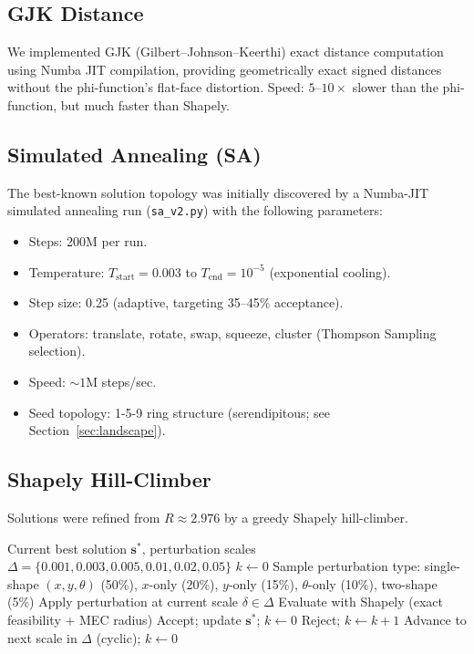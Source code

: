\documentclass[11pt]{article}
\begin{document}
\subsection{GJK Distance}

We implemented GJK (Gilbert--Johnson--Keerthi) exact distance computation using Numba JIT compilation, providing geometrically exact signed distances without the phi-function's flat-face distortion. Speed: $5$--$10\times$ slower than the phi-function, but much faster than Shapely.

\subsection{Simulated Annealing (SA)}
\label{sec:sa}

The best-known solution topology was initially discovered by a Numba-JIT simulated annealing run (\texttt{sa\_v2.py}) with the following parameters:
\begin{itemize}
  \item Steps: 200M per run.
  \item Temperature: $T_{\mathrm{start}} = 0.003$ to $T_{\mathrm{end}} = 10^{-5}$ (exponential cooling).
  \item Step size: 0.25 (adaptive, targeting 35--45\% acceptance).
  \item Operators: translate, rotate, swap, squeeze, cluster (Thompson Sampling selection).
  \item Speed: ${\sim}1$M steps/sec.
  \item Seed topology: 1-5-9 ring structure (serendipitous; see Section~\ref{sec:landscape}).
\end{itemize}

\subsection{Shapely Hill-Climber}
\label{sec:hc}

Solutions were refined from $R \approx 2.976$ by a greedy Shapely hill-climber.

\begin{algorithm}[t]
\caption{Shapely Greedy Hill-Climber}\label{alg:hc}
\begin{algorithmic}[1]
\REQUIRE Current best solution $\mathbf{s}^*$, perturbation scales $\Delta = \{0.001, 0.003, 0.005, 0.01, 0.02, 0.05\}$
\STATE $k \gets 0$ 
  \STATE Sample perturbation type: single-shape $(x,y,\theta)$ (50\%), $x$-only (20\%), $y$-only (15\%), $\theta$-only (10\%), two-shape (5\%)
  \STATE Apply perturbation at current scale $\delta \in \Delta$
  \STATE Evaluate with Shapely (exact feasibility + MEC radius)
    \STATE Accept; update $\mathbf{s}^*$; $k \gets 0$
  \ELSE
    \STATE Reject; $k \gets k + 1$
  \ENDIF
    \STATE Advance to next scale in $\Delta$ (cyclic); $k \gets 0$
  \ENDIF
\ENDWHILE
\end{algorithmic}
\end{algorithm}
\end{document}
